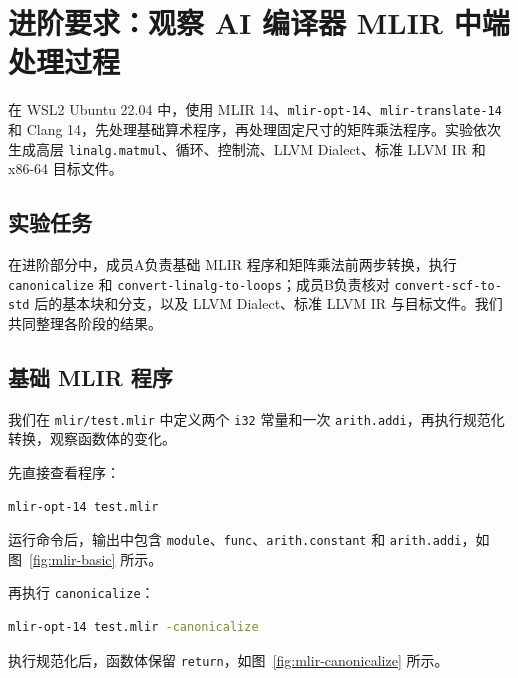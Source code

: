 \section{进阶要求：观察 AI 编译器 MLIR 中端处理过程}

在 WSL2 Ubuntu 22.04 中，使用 MLIR 14、\texttt{mlir-opt-14}、\texttt{mlir-translate-14} 和 Clang 14，先处理基础算术程序，再处理固定尺寸的矩阵乘法程序。实验依次生成高层 \texttt{linalg.matmul}、循环、控制流、LLVM Dialect、标准 LLVM IR 和 x86-64 目标文件。


\subsection{实验任务}

在进阶部分中，成员A负责基础 MLIR 程序和矩阵乘法前两步转换，执行 \texttt{canonicalize} 和 \texttt{convert-linalg-to-loops}；成员B负责核对 \texttt{convert-scf-to-std} 后的基本块和分支，以及 LLVM Dialect、标准 LLVM IR 与目标文件。我们共同整理各阶段的结果。

\subsection{基础 MLIR 程序}

我们在 \texttt{mlir/test.mlir} 中定义两个 \texttt{i32} 常量和一次 \texttt{arith.addi}，再执行规范化转换，观察函数体的变化。



先直接查看程序：

\begin{lstlisting}[language=bash]
mlir-opt-14 test.mlir
\end{lstlisting}

运行命令后，输出中包含 \texttt{module}、\texttt{func}、\texttt{arith.constant} 和 \texttt{arith.addi}，如图~\ref{fig:mlir-basic} 所示。


再执行 \texttt{canonicalize}：

\begin{lstlisting}[language=bash]
mlir-opt-14 test.mlir -canonicalize
\end{lstlisting}

执行规范化后，函数体保留 \texttt{return}，如图~\ref{fig:mlir-canonicalize} 所示。


